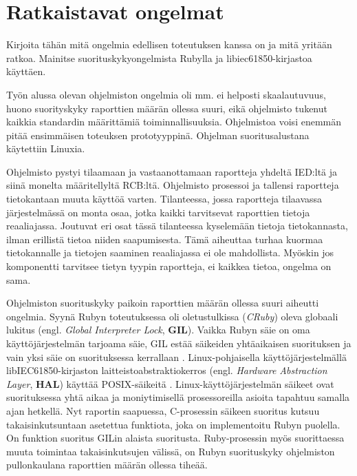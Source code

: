 \section{Ratkaistavat ongelmat}
\begin{it}
	Kirjoita tähän mitä ongelmia edellisen toteutuksen kanssa on ja mitä yritään ratkoa. Mainitse suorituskykyongelmista Rubylla ja libiec61850-kirjastoa käyttäen.
\end{it}

Työn alussa olevan ohjelmiston ongelmia oli mm. ei helposti skaalautuvuus, huono suorityskyky raporttien määrän ollessa suuri, eikä ohjelmisto tukenut kaikkia standardin määrittämiä toiminnallisuuksia. Ohjelmistoa voisi enemmän pitää ensimmäisen toteuksen prototyyppinä. Ohjelman suoritusalustana käytettiin Linuxia.

Ohjelmisto pystyi tilaamaan ja vastaanottamaan raportteja yhdeltä IED:ltä ja siinä monelta määritellyltä RCB:ltä. Ohjelmisto prosessoi ja tallensi raportteja tietokantaan muuta käyttöä varten. Tilanteessa, jossa raportteja tilaavassa järjestelmässä on monta osaa, jotka kaikki tarvitsevat raporttien tietoja reaaliajassa. Joutuvat eri osat tässä tilanteessa kyselemään tietoja tietokannasta, ilman erillistä tietoa niiden saapumisesta. Tämä aiheuttaa turhaa kuormaa tietokannalle ja tietojen saaminen reaaliajassa ei ole mahdollista. Myöskin jos komponentti tarvitsee tietyn tyypin raportteja, ei kaikkea tietoa, ongelma on sama.

Ohjelmiston suorituskyky paikoin raporttien määrän ollessa suuri aiheutti ongelmia. Syynä Rubyn toteutuksessa oli oletustulkissa (\emph{CRuby}) oleva globaali lukitus (engl. \emph{Global Interpreter Lock}, \textbf{GIL}). Vaikka Rubyn säie on oma käyttöjärjestelmän tarjoama säie, GIL estää säikeiden yhtäaikaisen suorituksen ja vain yksi säie on suorituksessa kerrallaan \mbox{\cite[s.~131--133]{Odaira2014}}. Linux-pohjaisella käyttöjärjestelmällä libIEC61850-kirjaston laitteistoabstraktiokerros (engl. \emph{Hardware Abstraction Layer}, \textbf{HAL}) käyttää POSIX-säikeitä \cite{libIEC61850-repo}. Linux-käyttöjärjestelmän säikeet ovat suorituksessa yhtä aikaa ja moniytimisellä prosessoreilla asioita tapahtuu samalla ajan hetkellä. Nyt raportin saapuessa, C-prosessin säikeen suoritus kutsuu takaisinkutsuntaan asetettua funktiota, joka on implementoitu Rubyn puolella. On funktion suoritus GILin alaista suoritusta. Ruby-prosessin myös suorittaessa muuta toimintaa takaisinkutsujen välissä, on Rubyn suorituskyky ohjelmiston pullonkaulana raporttien määrän ollessa tiheää.

